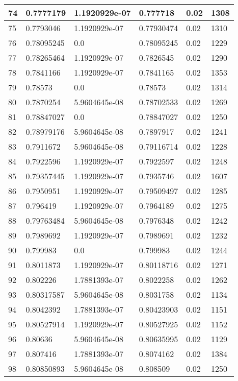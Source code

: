 \begin{longtable}{|l|l|l|l|l|l|}
74 & 0.7777179 & 1.1920929e-07 & 0.777718 & 0.02 & 1308 \\ \hline 
75 & 0.7793046 & 1.1920929e-07 & 0.77930474 & 0.02 & 1310 \\ \hline 
76 & 0.78095245 & 0.0 & 0.78095245 & 0.02 & 1229 \\ \hline 
77 & 0.78265464 & 1.1920929e-07 & 0.7826545 & 0.02 & 1290 \\ \hline 
78 & 0.7841166 & 1.1920929e-07 & 0.7841165 & 0.02 & 1353 \\ \hline 
79 & 0.78573 & 0.0 & 0.78573 & 0.02 & 1314 \\ \hline 
80 & 0.7870254 & 5.9604645e-08 & 0.78702533 & 0.02 & 1269 \\ \hline 
81 & 0.78847027 & 0.0 & 0.78847027 & 0.02 & 1250 \\ \hline 
82 & 0.78979176 & 5.9604645e-08 & 0.7897917 & 0.02 & 1241 \\ \hline 
83 & 0.7911672 & 5.9604645e-08 & 0.79116714 & 0.02 & 1228 \\ \hline 
84 & 0.7922596 & 1.1920929e-07 & 0.7922597 & 0.02 & 1248 \\ \hline 
85 & 0.79357445 & 1.1920929e-07 & 0.7935746 & 0.02 & 1607 \\ \hline 
86 & 0.7950951 & 1.1920929e-07 & 0.79509497 & 0.02 & 1285 \\ \hline 
87 & 0.796419 & 1.1920929e-07 & 0.7964189 & 0.02 & 1275 \\ \hline 
88 & 0.79763484 & 5.9604645e-08 & 0.7976348 & 0.02 & 1242 \\ \hline 
89 & 0.7989692 & 1.1920929e-07 & 0.7989691 & 0.02 & 1232 \\ \hline 
90 & 0.799983 & 0.0 & 0.799983 & 0.02 & 1244 \\ \hline 
91 & 0.8011873 & 1.1920929e-07 & 0.80118716 & 0.02 & 1271 \\ \hline 
92 & 0.802226 & 1.7881393e-07 & 0.8022258 & 0.02 & 1262 \\ \hline 
93 & 0.80317587 & 5.9604645e-08 & 0.8031758 & 0.02 & 1134 \\ \hline 
94 & 0.8042392 & 1.7881393e-07 & 0.80423903 & 0.02 & 1151 \\ \hline 
95 & 0.80527914 & 1.1920929e-07 & 0.80527925 & 0.02 & 1152 \\ \hline 
96 & 0.80636 & 5.9604645e-08 & 0.80635995 & 0.02 & 1129 \\ \hline 
97 & 0.807416 & 1.7881393e-07 & 0.8074162 & 0.02 & 1384 \\ \hline 
98 & 0.80850893 & 5.9604645e-08 & 0.808509 & 0.02 & 1250 \\ \hline 

\end{longtable}
